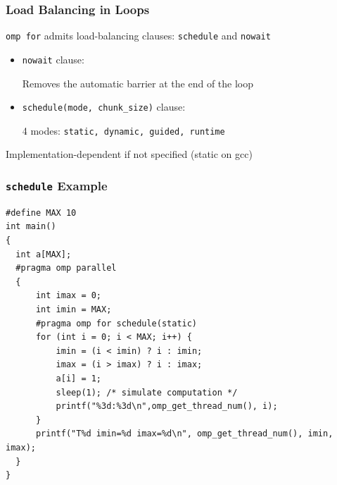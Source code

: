 \documentclass{beamer}
\begin{document}

\begin{frame}
  \frametitle{Load Balancing in Loops}
  
  \texttt{omp for} admits load-balancing clauses: \texttt{schedule} and \texttt{nowait}
  
  \bigskip
  
  \begin{itemize}
  \item \texttt{nowait} clause:
    
    Removes the automatic barrier at the end of the loop
  
    \bigskip
  \item \texttt{schedule(mode, chunk\_size)} clause:
      
    4 modes: \texttt{static, dynamic, guided, runtime}
  \end{itemize}
  
  \bigskip

  Implementation-dependent if not specified (static on gcc)
\end{frame}

\begin{frame}[fragile=singleslide]
   \frametitle{\texttt{schedule} Example}
   \small
  
\begin{verbatim}
#define MAX 10
int main()
{
  int a[MAX];
  #pragma omp parallel
  {
      int imax = 0;
      int imin = MAX;
      #pragma omp for schedule(static)
      for (int i = 0; i < MAX; i++) {
          imin = (i < imin) ? i : imin;
          imax = (i > imax) ? i : imax;
          a[i] = 1;
          sleep(1); /* simulate computation */
          printf("%3d:%3d\n",omp_get_thread_num(), i);
      }
      printf("T%d imin=%d imax=%d\n", omp_get_thread_num(), imin, imax);
  }
}
\end{verbatim}
\end{frame}

\end{document}
